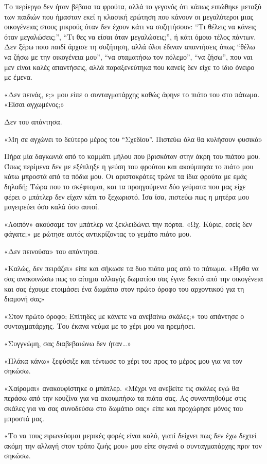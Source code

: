 \documentclass[12pt,twoside, openany]{book}
\begin{document}
Το περίεργο δεν ήταν βέβαια τα φρούτα, αλλά το γεγονός ότι κάπως ειπώθηκε μεταξύ των παιδιών που ήμασταν εκεί η κλασική ερώτηση που κάνουν οι μεγαλύτεροι μιας οικογένειας στους μικρούς όταν δεν έχουν κάτι να συζητήσουν: “Τι θέλεις να κάνεις όταν μεγαλώσεις;”, “Τι θες να είσαι όταν μεγαλώσεις;”, ή κάτι όμοιο τέλος πάντων. Δεν ξέρω ποιο παιδί άρχισε τη συζήτηση, αλλά όλοι έδιναν απαντήσεις όπως “θέλω να ζήσω με την οικογένεια μου”, “να σταματήσω τον πόλεμο”, “να ζήσω”, που ναι μεν είναι καλές απαντήσεις, αλλά παραξενεύτηκα που κανείς δεν είχε το ίδιο όνειρο με έμενα.

«Δεν πεινάς, ε;» μου είπε ο συνταγματάρχης καθώς άφηνε το πιάτο του στο πάτωμα. «Είσαι αγχωμένος;»

Δεν του απάντησα.

«Μη σε αγχώνει το δεύτερο μέρος του “Σχεδίου”. Πιστεύω όλα θα κυλήσουν φυσικά»

Πήρα μία δαγκωνιά από το κομμάτι μήλου που βρισκόταν στην άκρη του πιάτου μου. Όπως περίμενα δεν με εξέπληξε η γεύση του φρούτου και ακούμπησα το πιάτο μου κάτω μπροστά από τα πόδια μου. Οι αριστοκράτες τρώνε τα ίδια φρούτα με εμάς δηλαδή; Τώρα που το σκέφτομαι, και τα προηγούμενα δύο γεύματα που μας είχε φέρει ο μπάτλερ δεν είχαν κάτι το ξεχωριστό. Ίσα ίσα, πιστεύω πως η μητέρα μου μαγειρεύει όσο καλά όσο αυτοί.

«Λοιπόν» ακούσαμε τον μπάτλερ να ξεκλειδώνει την πόρτα. «Ωχ. Κύριε, εσείς δεν φάγατε;» με ρώτησε αυτός αντικρίζοντας το γεμάτο πιάτο μου.

«Δεν πεινούσα» του απάντησα.

«Καλώς, δεν πειράζει» είπε και σήκωσε τα δυο πιάτα μας από το πάτωμα. «Ήρθα να σας ανακοινώσω πως το αίτημα αλλαγής δωματίου σας έγινε δεκτό από την οικογένεια και σας έχουμε ετοιμάσει ένα δωμάτιο στον πρώτο όροφο του αρχοντικού για τη διαμονή σας»

«Στον πρώτο όροφο; Επίτηδες με κάνετε να ανεβαίνω σκάλες;» του απάντησε ο συνταγματάρχης. Του έκανα νεύμα με το χέρι μου να ηρεμήσει.

«Συγγνώμη, σας διαβεβαιώνω δεν ήταν…»

«Πλάκα κάνω» ξεφύσιξε και τέντωσε το χέρι του προς το μέρος μου για να τον σηκώσω.

«Χαίρομαι» ανακουφίστηκε ο μπάτλερ. «Μέχρι να ανεβείτε τις σκάλες εγώ θα περάσω από την κουζίνα για να ακουμπήσω τα πιάτα σας. Ας συναντηθούμε στις σκάλες για να σας συνοδεύσω στο δωμάτιο σας» είπε και προχώρησε μόνος του μπροστά μας.

«Το να τους ειρωνεύομαι μερικές φορές είναι καλό, γιατί δείχνει πως δεν έχω δεχτεί ακόμη την αλλαγή στον τρόπο ζωής μου» μου είπε σιγανά ο συνταγματάρχης πριν τον σηκώσω.
\end{document}
